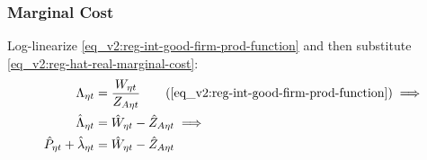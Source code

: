 \documentclass[../thesis.tex]{subfiles}
\begin{document}
\subsubsection*{Marginal Cost}
Log-linearize \ref{eq_v2:reg-int-good-firm-prod-function} and then substitute \ref{eq_v2:reg-hat-real-marginal-cost}:
\begin{align}
	\Lambda_{\eta t} &= \frac{W_{\eta t}}{Z_{A\eta t}} \tag{\ref{eq_v2:reg-int-good-firm-prod-function}} \implies \\
	\hat{\Lambda}_{\eta t} &= \hat{W}_{\eta t} - \hat{Z}_{A\eta t} \implies \nonumber \\
	\hat{P}_{\eta t} + \hat{\lambda}_{\eta t} &= \hat{W}_{\eta t} - \hat{Z}_{A\eta t} \label{eq_v2:reg-int-good-firm-FOC-Lt-ll}
\end{align}



\end{document}
